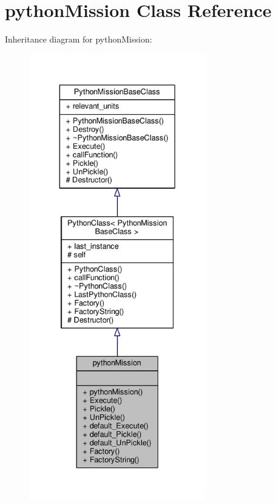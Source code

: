 \hypertarget{classpythonMission}{}\section{python\+Mission Class Reference}
\label{classpythonMission}


Inheritance diagram for python\+Mission\+:
\nopagebreak
\begin{figure}[H]
\begin{center}
\leavevmode
\includegraphics[height=550pt]{df/d2c/classpythonMission__inherit__graph}
\end{center}
\end{figure}


